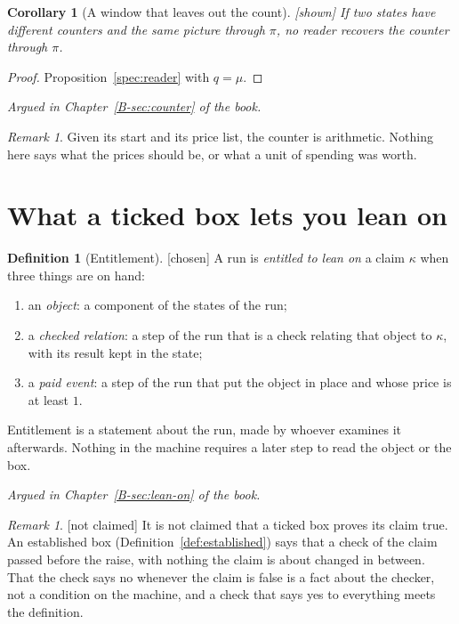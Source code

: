 \documentclass[11pt, a4paper]{article}
\theoremstyle{plain}
\newtheorem{corollary}[theorem]{Corollary}
\theoremstyle{definition}
\newtheorem{definition}[theorem]{Definition}
\theoremstyle{remark}
\newtheorem{remark}[theorem]{Remark}
\newcommand{\argued}[1]{\par\noindent\textit{Argued in Chapter~\ref{B-#1} of the book.}\par}
\newcommand{\kind}[1]{\textup{[#1]}}
\begin{document}
\begin{corollary}[A window that leaves out the count]\label{spec:count-window} \kind{shown}
If two states have different counters and the same picture through $\pi$, no reader recovers the counter
through $\pi$.
\end{corollary}
\begin{proof}
Proposition~\ref{spec:reader} with $q=\mu$.
\end{proof}
\argued{sec:counter}

\begin{remark}\label{spec:counter-scope}
Given its start and its price list, the counter is arithmetic. Nothing here says what the prices should be,
or what a unit of spending was worth.
\end{remark}
\section{What a ticked box lets you lean on}\label{spec:ch12}

\begin{definition}[Entitlement]\label{spec:entitlement} \kind{chosen}
A run is \emph{entitled to lean on} a claim $\kappa$ when three things are on hand:
\begin{enumerate}[label=(\roman*)]
\item an \emph{object}: a component of the states of the run;
\item a \emph{checked relation}: a step of the run that is a check relating that object to $\kappa$, with
its result kept in the state;
\item a \emph{paid event}: a step of the run that put the object in place and whose price is at least $1$.
\end{enumerate}
Entitlement is a statement about the run, made by whoever examines it afterwards. Nothing in the machine
requires a later step to read the object or the box.
\end{definition}

\argued{sec:lean-on}

\begin{remark}\label{spec:not-proves-true} \kind{not claimed}
It is not claimed that a ticked box proves its claim true. An established box (Definition~\ref{def:established})
says that a check of the claim passed before the raise, with nothing the claim is about changed in between.
That the check says no whenever the claim is false is a fact about the checker, not a condition on the
machine, and a check that says yes to everything meets the definition.
\end{remark}
\end{document}
